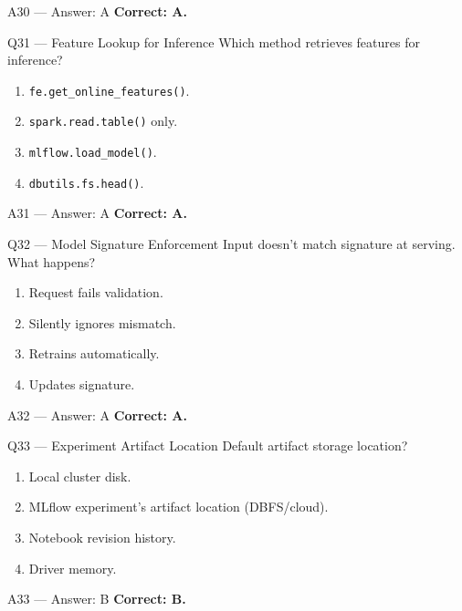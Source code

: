 \documentclass[aspectratio=169,9pt]{beamer}
\begin{document}
	\begin{frame}{A30 — Answer: A}
		\textbf{Correct: A.}
	\end{frame}
	
	\begin{frame}{Q31 — Feature Lookup for Inference}
		Which method retrieves features for inference?
		\begin{enumerate}[label=\Alph*.]
			\item \texttt{fe.get\_online\_features()}.
			\item \texttt{spark.read.table()} only.
			\item \texttt{mlflow.load\_model()}.
			\item \texttt{dbutils.fs.head()}.
		\end{enumerate}
	\end{frame}
	
	\begin{frame}{A31 — Answer: A}
		\textbf{Correct: A.}
	\end{frame}
	
	\begin{frame}{Q32 — Model Signature Enforcement}
		Input doesn't match signature at serving. What happens?
		\begin{enumerate}[label=\Alph*.]
			\item Request fails validation.
			\item Silently ignores mismatch.
			\item Retrains automatically.
			\item Updates signature.
		\end{enumerate}
	\end{frame}
	
	\begin{frame}{A32 — Answer: A}
		\textbf{Correct: A.}
	\end{frame}
	
	\begin{frame}{Q33 — Experiment Artifact Location}
		Default artifact storage location?
		\begin{enumerate}[label=\Alph*.]
			\item Local cluster disk.
			\item MLflow experiment's artifact location (DBFS/cloud).
			\item Notebook revision history.
			\item Driver memory.
		\end{enumerate}
	\end{frame}
	
	\begin{frame}{A33 — Answer: B}
		\textbf{Correct: B.}
	\end{frame}
	
\end{document}
